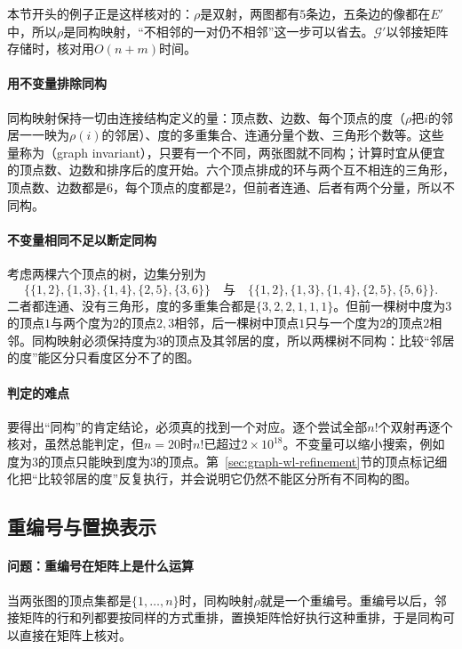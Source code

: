 本节开头的例子正是这样核对的：$\rho$是双射，两图都有$5$条边，五条边的像都在$E'$中，所以$\rho$是同构映射，“不相邻的一对仍不相邻”这一步可以省去。$\mathcal G'$以邻接矩阵存储时，核对用$O(n+m)$时间。

\paragraph{用不变量排除同构}
同构映射保持一切由连接结构定义的量：顶点数、边数、每个顶点的度（$\rho$把$i$的邻居一一映为$\rho(i)$的邻居）、度的多重集合、连通分量个数、三角形个数等。这些量称为（graph invariant），只要有一个不同，两张图就不同构；计算时宜从便宜的顶点数、边数和排序后的度开始。六个顶点排成的环与两个互不相连的三角形，顶点数、边数都是$6$，每个顶点的度都是$2$，但前者连通、后者有两个分量，所以不同构。

\paragraph{不变量相同不足以断定同构}
考虑两棵六个顶点的树，边集分别为
\[
\bigl\{\{1,2\},\{1,3\},\{1,4\},\{2,5\},\{3,6\}\bigr\}
\quad\text{与}\quad
\bigl\{\{1,2\},\{1,3\},\{1,4\},\{2,5\},\{5,6\}\bigr\}.
\]
二者都连通、没有三角形，度的多重集合都是$\{3,2,2,1,1,1\}$。但前一棵树中度为$3$的顶点$1$与两个度为$2$的顶点$2,3$相邻，后一棵树中顶点$1$只与一个度为$2$的顶点$2$相邻。同构映射必须保持度为$3$的顶点及其邻居的度，所以两棵树不同构：比较“邻居的度”能区分只看度区分不了的图。

\paragraph{判定的难点}
要得出“同构”的肯定结论，必须真的找到一个对应。逐个尝试全部$n!$个双射再逐个核对，虽然总能判定，但$n=20$时$n!$已超过$2\times10^{18}$。不变量可以缩小搜索，例如度为$3$的顶点只能映到度为$3$的顶点。第~\ref{sec:graph-wl-refinement}节的顶点标记细化把“比较邻居的度”反复执行，并会说明它仍然不能区分所有不同构的图。

\subsection{重编号与置换表示}
\label{sec:graph-conn-relabeling}

\paragraph{问题：重编号在矩阵上是什么运算}
当两张图的顶点集都是$\{1,\ldots,n\}$时，同构映射$\rho$就是一个重编号。重编号以后，邻接矩阵的行和列都要按同样的方式重排，置换矩阵恰好执行这种重排，于是同构可以直接在矩阵上核对。

